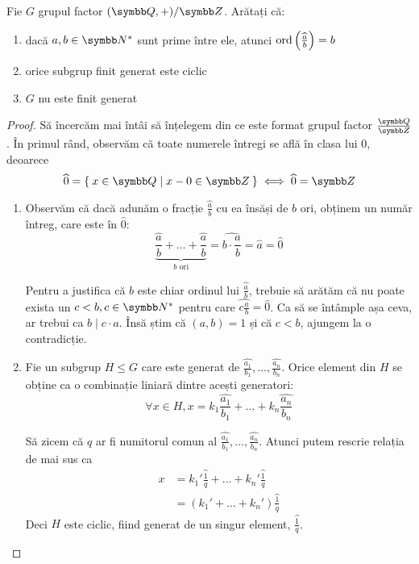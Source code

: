\begin{exercise}
Fie \(G\) grupul factor \((\rationals, +) / \integers\). Arătați că:

\begin{enumerate}
    \item dacă \(a, b \in \naturals^*\) sunt prime între ele, atunci \(\operatorname{ord}\left(\widehat{\frac{a}{b}}\right) = b\)
    \item orice subgrup finit generat este ciclic
    \item \(G\) nu este finit generat
\end{enumerate}
\end{exercise}
\begin{proof}
Să încercăm mai întâi să înțelegem din ce este format grupul factor \(\frac{\rationals}{\integers}\). În primul rând, observăm că toate numerele întregi se află în clasa lui 0, deoarece
\[
    \widehat{0} = \Set{ x \in \rationals | x - 0 \in \integers } \iff \widehat{0} = \integers
\]

\begin{enumerate}
    \item Observăm că dacă adunăm o fracție \(\widehat{\frac{a}{b}}\) cu ea însăși de \(b\) ori, obținem un număr întreg, care este în \(\widehat{0}\):
    \[
        \underbrace{\widehat{\frac{a}{b}} + \dots + \widehat{\frac{a}{b}}}_{b \text{ ori}} = \widehat{b \cdot \frac{a}{b}} = \widehat{a} = \widehat{0}
    \]

    Pentru a justifica că \(b\) este chiar ordinul lui \(\widehat{\frac{a}{b}}\), trebuie să arătăm că nu poate exista un \(c < b, c \in \naturals^*\) pentru care \(\widehat{c \frac{a}{b}} = \widehat{0}\). Ca să se întâmple așa ceva, ar trebui ca \(b \mid c \cdot a\). Însă știm că \((a, b) = 1\) și că \(c < b\), ajungem la o contradicție.

    \item Fie un subgrup \(H \leq G\) care este generat de \(\widehat{\frac{a_1}{b_1}}, \dots, \widehat{\frac{a_n}{b_n}}\).
    Orice element din \(H\) se obține ca o combinație liniară dintre acești generatori:
    \[
        \forall x \in H, x = k_1 \widehat{\frac{a_1}{b_1}} + \dots + k_n \widehat{\frac{a_n}{b_n}}
    \]

    Să zicem că \(q\) ar fi numitorul comun al  \(\widehat{\frac{a_1}{b_1}}, \dots, \widehat{\frac{a_n}{b_n}}\). Atunci putem rescrie relația de mai sus ca
    \begin{align*}
        x &= k_1' \widehat{\frac{1}{q}} + \dots + k_n' \widehat{\frac{1}{q}} \\
        &= (k_1' + \dots + k_n') \widehat{\frac{1}{q}}
    \end{align*}
    Deci \(H\) este ciclic, fiind generat de un singur element, \(\widehat{\frac{1}{q}}\).


\end{enumerate}
\end{proof}
